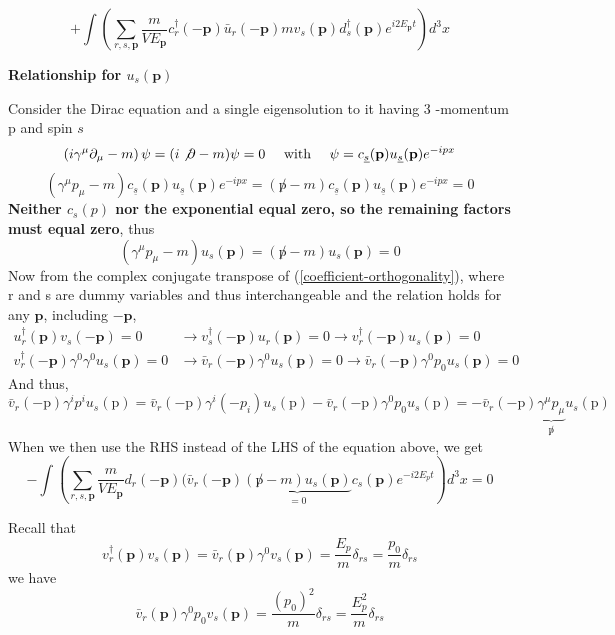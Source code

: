 $$
+\int\left(\sum_{r, s, \mathbf{p}} \frac{m}{V E_{\mathbf{p}}} c_{r}^{\dagger}(-\mathbf{p}) \bar{u}_{r}(-\mathbf{p}) m v_{s}(\mathbf{p}) d_{s}^{\dagger}(\mathbf{p}) e^{i 2 E_{\mathbf{p}} t}\right) d^{3} x
$$
\begin{mybox}
\textbf{Relationship for $u_{s}(\mathbf{p})$}

Consider the Dirac equation and a single eigensolution to it having 3 -momentum p and spin $s$
$$
\left(i \gamma^{\mu} \partial_{\mu}-m\right) \psi=(i \not \partial-m) \psi=0 \quad \text { with } \quad \psi=c_{\underline{s}}(\mathbf{p}) u_{\underline{s}}(\mathbf{p}) e^{-i p x}
$$
$$
\left(\gamma^{\mu} p_{\mu}-m\right) c_{\underline{s}}(\mathbf{p}) u_{\underline{s}}(\mathbf{p}) e^{-i p x}=(\not p-m) c_{\underline{s}}(\mathbf{p}) u_{\underline{s}}(\mathbf{p}) e^{-i p x}=0
$$
\textbf{Neither $c_{s}(p)$ nor the exponential equal zero, so the remaining factors must equal zero}, thus
$$
\left(\gamma^{\mu} p_{\mu}-m\right) u_{s}(\mathbf{p})=(\not p-m) u_{s}(\mathbf{p})=0
$$
Now from the complex conjugate transpose of (\ref{coefficient-orthogonality}), where r and s are dummy variables and thus interchangeable and the relation holds for any $\mathbf{p}$, including $-\mathbf{p}$,
$$
\begin{aligned}
u_{r}^{\dagger}(\mathbf{p}) v_{s}(-\mathbf{p})=0 & \rightarrow v_{s}^{\dagger}(-\mathbf{p}) u_{r}(\mathbf{p})=0 \rightarrow v_{r}^{\dagger}(-\mathbf{p}) u_{s}(\mathbf{p})=0 \\
v_{r}^{\dagger}(-\mathbf{p}) \gamma^{0} \gamma^{0} u_{s}(\mathbf{p})=0 & \rightarrow \bar{v}_{r}(-\mathbf{p}) \gamma^{0} u_{s}(\mathbf{p})=0 \rightarrow \bar{v}_{r}(-\mathbf{p}) \gamma^{0} p_{0} u_{s}(\mathbf{p})=0
\end{aligned}
$$
And thus,
$$
\bar{v}_{r}(-\mathrm{p}) \gamma^{i} p^{i} u_{s}(\mathrm{p})=\bar{v}_{r}(-\mathrm{p}) \gamma^{i}\left(-p_{i}\right) u_{s}(\mathrm{p})-\bar{v}_{r}(-\mathrm{p}) \gamma^{0} p_{0} u_{s}(\mathrm{p})=-\bar{v}_{r}(-\mathrm{p}) \underbrace{\gamma^{\mu} p_{\mu}}_{\not p} u_{s}(\mathrm{p})
$$
When we then use the RHS instead of the LHS of the equation above, we get
$$
-\int\left(\sum_{r, s, \mathbf{p}} \frac{m}{V E_{\mathbf{p}}} d_{r}(-\mathbf{p})(\bar{v}_{r}(-\mathbf{p})\underbrace{(\not p-m)u_s(\mathbf{p})}_{=0} c_{s}(\mathbf{p}) e^{-i 2 E_{p} t}\right) d^{3} x=0
$$
\end{mybox}
Recall that 
$$
v_{r}^{\dagger}(\mathbf{p}) v_{s}(\mathbf{p})=\bar{v}_{r}(\mathbf{p}) \gamma^{0} v_{s}(\mathbf{p})=\frac{E_{p}}{m} \delta_{r s}=\frac{p_{0}}{m} \delta_{r s}
$$
we have
$$
\bar{v}_{r}(\mathbf{p}) \gamma^{0} p_{0} v_{s}(\mathbf{p})=\frac{\left(p_{0}\right)^{2}}{m} \delta_{r s}=\frac{E_{p}^{2}}{m} \delta_{r s}
$$
